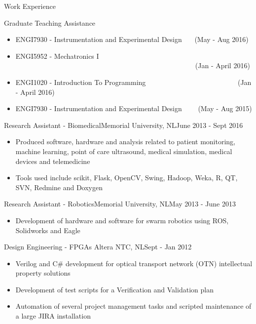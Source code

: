 \documentclass[calibri]{mcdowellcv}
\begin{document}
	\begin{cvsection}{Work Experience}
		
	\renewcommand\labelitemi{$\cdot$}

		\begin{cvsubsection}{Graduate Teaching Assistance}{}{}
			\begin{itemize}
			\item ENGI7930 - Instrumentation and Experimental Design~~~ (May - Aug 2016)
			\item ENGI5952 - Mechatronics I ~~~~~~~~~~~~~~~~~~~~~~~~~~~~~~~~~~~~~~~~~~~~~~~~~~~~(Jan - April 2016)
			\item ENGI1020 - Introduction To Programming ~~~~~~~~~~~~~~~~~~~~~~~~~~(Jan - April 2016)
			\item ENGI7930 - Instrumentation and Experimental Design ~~~~(May - Aug 2015)
			\end{itemize}
		\end{cvsubsection}

		\begin{cvsubsection}{Research Assistant - Biomedical}{Memorial University, NL}{June 2013 - Sept 2016}		
			\begin{itemize}
				\item Produced software, hardware and analysis related to patient monitoring, machine learning, point of care ultrasound, medical simulation, medical devices and telemedicine
				\item Tools used include scikit, Flask, OpenCV, Swing, Hadoop, Weka, R, QT, SVN, Redmine and Doxygen 
			\end{itemize}
		\end{cvsubsection}

		\begin{cvsubsection}{Research Assistant - Robotics}{Memorial University, NL}{May 2013 - June 2013}	
			\begin{itemize}
				\item Development of hardware and software for swarm robotics using ROS, Solidworks and Eagle
			\end{itemize}
		\end{cvsubsection}
		
		\begin{cvsubsection}{Design Engineering - FPGAs }{Altera NTC, NL}{Sept - Jan 2012}		
			\begin{itemize}
				\item Verilog and C\# development for optical transport network (OTN) intellectual property solutions
				\item Development of test scripts for a Verification and Validation plan
				\item Automation of several project management tasks and scripted maintenance of a large JIRA installation
			\end{itemize}
		\end{cvsubsection}
		

\end{cvsection}
\end{document}
